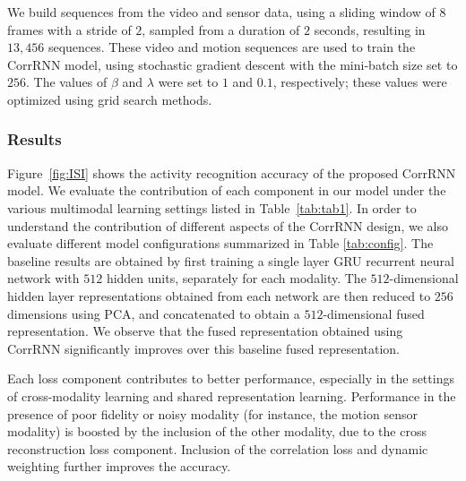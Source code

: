 \documentclass[10pt,twocolumn,letterpaper]{article}
\begin{document}
We build sequences from the video and sensor data, using a sliding window of 8 frames with a stride of $2$, sampled from a duration of $2$ seconds, resulting in $13,456$ sequences. 
These video and motion sequences are used to train the CorrRNN model, using stochastic gradient descent with the mini-batch size set to $256$. The values of $\beta$ and $\lambda$ were set to $1$ and $0.1$, respectively; these values were optimized using grid search methods. %



\subsubsection{Results}
Figure~\ref{fig:ISI} shows the activity recognition accuracy of the proposed CorrRNN model.
We evaluate the contribution of each component in our model under the various multimodal learning settings listed in Table~\ref{tab:tab1}. In order to understand the contribution of different aspects of the CorrRNN design, we also evaluate different model configurations summarized in Table \ref{tab:config}.
The baseline results are obtained by first training a single layer GRU recurrent neural network with $512$ hidden units, separately for each modality. The $512$-dimensional hidden layer representations obtained from each network are then reduced to $256$ dimensions using PCA, and concatenated to obtain a $512$-dimensional fused representation. We observe that the fused representation obtained using CorrRNN significantly improves over this baseline fused representation.  

Each loss component contributes to better performance, especially in the settings of cross-modality learning and shared representation learning. Performance in the presence of poor fidelity or noisy modality (for instance, the motion sensor modality) is boosted by the inclusion of the other modality, due to the cross reconstruction loss component. Inclusion of the correlation loss and dynamic weighting further improves the accuracy. 
\end{document}
